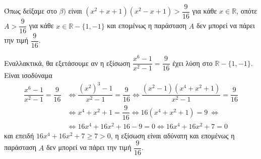 \begin{alist}
\begin{rlist}
Όπως δείξαμε στο $\beta)$ είναι $(x^2 + x + 1)(x^2 - x + 1) > \dfrac{9}{16}$ για κάθε $x \in \mathbb{R}$, οπότε
$A > \dfrac{9}{16}$ για κάθε $x \in \mathbb{R} - \{1, -1\}$ και επομένως η παράσταση $A$ δεν μπορεί να
πάρει την τιμή $\dfrac{9}{16}$.

Εναλλακτικά, θα εξετάσουμε αν η εξίσωση
$\dfrac{x^6 - 1}{x^2 - 1} = \dfrac{9}{16}$ έχει λύση στο $\mathbb{R} - \{1, -1\}$. Είναι ισοδύναμα
\begin{align*}
\dfrac{x^6 - 1}{x^2 - 1} = \dfrac{9}{16} &\Leftrightarrow \dfrac{(x^2)^3 - 1}{x^2 - 1} = \dfrac{9}{16} \Leftrightarrow \dfrac{(x^2 - 1)(x^4 + x^2 + 1)}{x^2 - 1} = \dfrac{9}{16}\\& \Leftrightarrow x^4 + x^2 + 1 = \dfrac{9}{16} \Leftrightarrow 16(x^4 + x^2 + 1) = 9 \ \Leftrightarrow \\
&\Leftrightarrow 16x^4 + 16x^2 + 16 - 9 = 0 \Leftrightarrow 16x^4 + 16x^2 + 7 = 0
\end{align*}
και επειδή $16x^4 + 16x^2 + 7 \ge 7 > 0$, η εξίσωση είναι αδύνατη και επομένως η
παράσταση $A$ δεν μπορεί να πάρει την τιμή $\dfrac{9}{16}$.
\end{rlist}
\end{alist}

